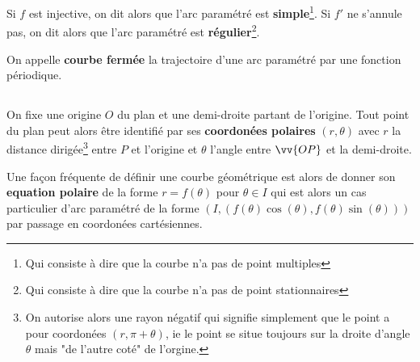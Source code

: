 Si \(f\) est injective, on dit alors que l'arc paramétré est \textbf{simple}\footnote[1]{Qui consiste à dire que la courbe n'a pas de point multiples}. \+
Si \(f'\) ne s'annule pas, on dit alors que l'arc paramétré est \textbf{régulier}\footnote[2]{Qui consiste à dire que la courbe n'a pas de point stationnaires}. \+

On appelle \textbf{courbe fermée} la trajectoire d'une arc paramétré par une fonction périodique.

\subsection*{}
On fixe une origine \(O\) du plan et une demi-droite partant de l'origine.
Tout point du plan peut alors être identifié par ses \textbf{coordonées polaires} \((r, \theta)\) avec \(r\) la distance dirigée\footnote[3]{ On autorise alors une rayon négatif qui signifie simplement que le point a pour coordonées \((r, \pi + \theta)\), ie le point se situe toujours sur la droite d'angle \(\theta\) mais "de l'autre coté" de l'orgine.} entre \(P\) et l'origine et \(\theta\) l'angle entre \(\vv{OP}\) et la demi-droite.\<

Une façon fréquente de définir une courbe géométrique est alors de donner son \textbf{equation polaire} de la forme \(r = f(\theta)\) pour \(\theta \in I\) qui est alors un cas particulier d'arc paramétré de la forme \((I, (f(\theta)\cos(\theta), f(\theta)\sin(\theta)))\) par passage en coordonées cartésiennes.
\pagebreak
